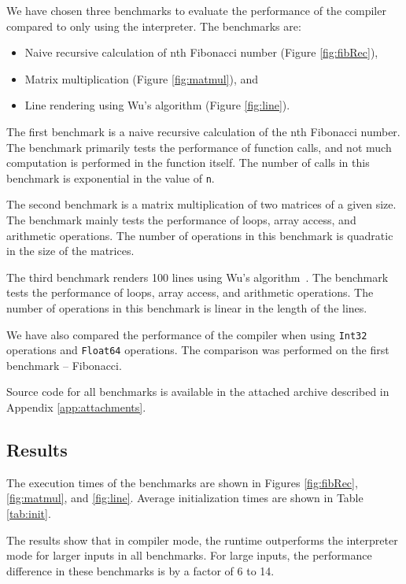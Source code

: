 We have chosen three benchmarks to evaluate the performance of the compiler compared to only using the interpreter. The benchmarks are:
\begin{itemize}
    \item Naive recursive calculation of nth Fibonacci number (Figure \ref{fig:fibRec}),
    \item Matrix multiplication (Figure \ref{fig:matmul}), and
    \item Line rendering using Wu's algorithm (Figure \ref{fig:line}).
\end{itemize}

The first benchmark is a naive recursive calculation of the nth Fibonacci number. The benchmark primarily tests the performance of function calls, and not much computation is performed in the function itself. The number of calls in this benchmark is exponential in the value of \texttt{n}.

The second benchmark is a matrix multiplication of two matrices of a given size. The benchmark mainly tests the performance of loops, array access, and arithmetic operations. The number of operations in this benchmark is quadratic in the size of the matrices.

The third benchmark renders 100 lines using Wu's algorithm~\cite{wu}. The benchmark tests the performance of loops, array access, and arithmetic operations. The number of operations in this benchmark is linear in the length of the lines.

We have also compared the performance of the compiler when using \texttt{Int32} operations and \texttt{Float64} operations. The comparison was performed on the first benchmark -- Fibonacci.

Source code for all benchmarks is available in the attached archive described in Appendix \ref{app:attachments}.


\subsection{Results}

The execution times of the benchmarks are shown in Figures \ref{fig:fibRec}, \ref{fig:matmul}, and \ref{fig:line}. Average initialization times are shown in Table \ref{tab:init}.

The results show that in compiler mode, the runtime outperforms the interpreter mode for larger inputs in all benchmarks. For large inputs, the performance difference in these benchmarks is by a factor of 6 to 14.

